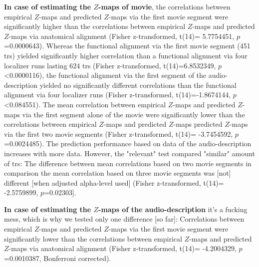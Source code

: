 \textbf{In case of estimating the $Z$-maps of movie}, the correlations between
empirical $Z$-maps and predicted $Z$-maps via the first movie segment were
significantly higher than the correlations between empirical $Z$-maps and
predicted $Z$-maps via anatomical alignment (Fisher z-transformed, t(14)=
5.7754451, $p$=0.0000643).
%
Whereas the functional alignment via the first movie segment (451 \acp{tr})
yielded significantly higher correlation than a functional alignment via four
localizer runs lasting 624 \acp{tr} (Fisher z-transformed, t(14)=6.8532349,
$p$<0.0000116),
%
the functional alignment via the first segment of the audio-description yielded
no significantly different correlations than the functional alignment via four
localizer runs (Fisher z-transformed, t(14)=-1.8674144, $p$<0.084551).
%
The mean correlation between empirical $Z$-maps and predicted $Z$-maps via the
first segment alone of the movie were significantly lower than the correlations
between empirical $Z$-maps and predicted $Z$-maps predicted $Z$-maps via the
first two movie segments (Fisher z-transformed, t(14)= -3.7454592,
$p$=0.0024485).
%
The prediction performance based on data of the audio-description
increases with more data. However, the "relevant" test compared "similar" amount
of \acp{tr}:
%
The difference between mean correlations based on two movie segments in
comparison the mean correlation based on three movie segments was [not]
different [when adjusted alpha-level used] (Fisher z-transformed, t(14)=
-2.5759899, $p$=0.02303].







\textbf{In case of estimating the $Z$-maps of the audio-description} it's a
fucking mess, which is why we tested only one difference [so far]:
%
Correlations between empirical $Z$-maps and predicted $Z$-maps via the first
movie segment were significantly lower than the correlations between empirical
$Z$-maps and predicted $Z$-maps via anatomical alignment (Fisher z-transformed,
t(14)= -4.2004329, $p$=0.0010387, Bonferroni corrected).


